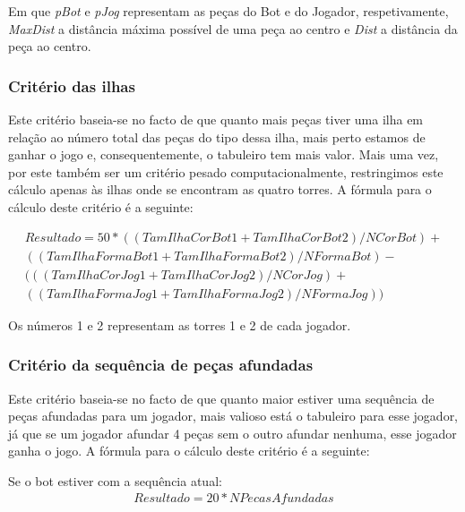 \documentclass[a4paper]{article}
\begin{document}
Em que \textit{pBot} e \textit{pJog} representam as peças do Bot e do Jogador, respetivamente, \textit{MaxDist} a distância máxima possível de uma peça ao centro e \textit{Dist} a distância da peça ao centro.

\subsubsection{Critério das ilhas}

Este critério baseia-se no facto de que quanto mais peças tiver uma ilha em relação ao número total das peças do tipo dessa ilha, mais perto estamos de ganhar o jogo e, consequentemente, o tabuleiro tem mais valor. Mais uma vez, por este também ser um critério pesado computacionalmente, restringimos este cálculo apenas às ilhas onde se encontram as quatro torres. A fórmula para o cálculo deste critério é a seguinte:

\begin{equation*}
\begin{multlined}
Resultado = 50 * ((TamIlhaCorBot1 + TamIlhaCorBot2) / NCorBot) + \\ ((TamIlhaFormaBot1 + TamIlhaFormaBot2) / NFormaBot) - \\
					( ((TamIlhaCorJog1 + TamIlhaCorJog2) / NCorJog) + \\ ((TamIlhaFormaJog1 + TamIlhaFormaJog2) / NFormaJog) )
\end{multlined}
\end{equation*}

Os números 1 e 2 representam as torres 1 e 2 de cada jogador.

\subsubsection{Critério da sequência de peças afundadas}

Este critério baseia-se no facto de que quanto maior estiver uma sequência de peças afundadas para um jogador, mais valioso está o tabuleiro para esse jogador, já que se um jogador afundar 4 peças sem o outro afundar nenhuma, esse jogador ganha o jogo. A fórmula para o cálculo deste critério é a seguinte:

Se o bot estiver com a sequência atual:
\begin{equation*}
\begin{multlined}
Resultado = 20 * NPecasAfundadas
\end{multlined}
\end{equation*}
\end{document}
